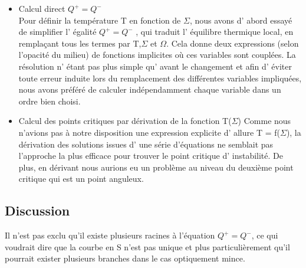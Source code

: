 \begin{itemize}

\item Calcul direct $Q^+ = Q^-$
\\
Pour définir la température T en fonction de $\Sigma$, nous avons d' abord essayé de simplifier l' égalité $Q^+ = Q^-$ , qui traduit l' équilibre thermique local, en remplaçant tous les termes par T,$\Sigma$ et $\Omega$. Cela donne deux expressions (selon l'opacité du milieu) de fonctions implicites où ces variables sont couplées.
La résolution n' étant pas plus simple qu' avant le changement et afin d' éviter toute erreur induite lors du remplacement des différentes variables impliquées, nous avons préféré de calculer indépendamment chaque variable dans un ordre bien choisi. 
\\

\item Calcul des points critiques par dérivation de la fonction T($\Sigma$)
Comme nous n'avions pas à notre disposition une expression explicite d' allure T = f($\Sigma$), la dérivation des solutions issues d' une série d'équations ne semblait pas l'approche la plus efficace pour trouver le point critique d' instabilité. De plus, en dérivant nous aurions eu un problème au niveau du deuxième point critique qui est un point anguleux.
\end{itemize}

\subsection{Discussion}
Il n'est pas exclu qu'il existe plusieurs racines à l'équation $Q^+ = Q^-$, ce qui voudrait dire que la courbe en S n'est pas unique et plus particulièrement qu'il pourrait exister plusieurs branches dans le cas optiquement mince. 



